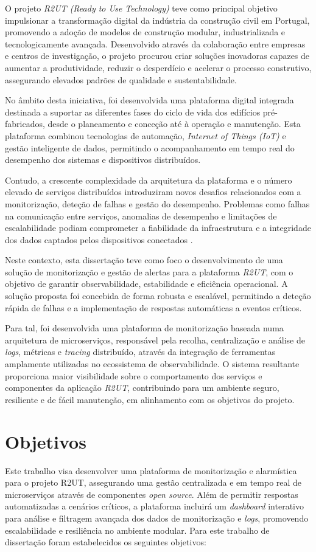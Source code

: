 O projeto \textit{R2UT (Ready to Use Technology)} teve como principal objetivo impulsionar a transformação digital da indústria da construção civil em Portugal, promovendo a adoção de modelos de construção modular, industrializada e tecnologicamente avançada. Desenvolvido através da colaboração entre empresas e centros de investigação, o projeto procurou criar soluções inovadoras capazes de aumentar a produtividade, reduzir o desperdício e acelerar o processo construtivo, assegurando elevados padrões de qualidade e sustentabilidade.

No âmbito desta iniciativa, foi desenvolvida uma plataforma digital integrada destinada a suportar as diferentes fases do ciclo de vida dos edifícios pré-fabricados, desde o planeamento e conceção até à operação e manutenção. Esta plataforma combinou tecnologias de automação, \textit{Internet of Things (IoT)} e gestão inteligente de dados, permitindo o acompanhamento em tempo real do desempenho dos sistemas e dispositivos distribuídos.

Contudo, a crescente complexidade da arquitetura da plataforma e o número elevado de serviços distribuídos introduziram novos desafios relacionados com a monitorização, deteção de falhas e gestão do desempenho. Problemas como falhas na comunicação entre serviços, anomalias de desempenho e limitações de escalabilidade podiam comprometer a fiabilidade da infraestrutura e a integridade dos dados captados pelos dispositivos conectados \cite{Barakat2017}.

Neste contexto, esta dissertação teve como foco o desenvolvimento de uma solução de monitorização e gestão de alertas para a plataforma \textit{R2UT}, com o objetivo de garantir observabilidade, estabilidade e eficiência operacional. A solução proposta foi concebida de forma robusta e escalável, permitindo a deteção rápida de falhas e a implementação de respostas automáticas a eventos críticos.

Para tal, foi desenvolvida uma plataforma de monitorização baseada numa arquitetura de microserviços, responsável pela recolha, centralização e análise de \textit{logs}, métricas e \textit{tracing} distribuído, através da integração de ferramentas amplamente utilizadas no ecossistema de observabilidade. O sistema resultante proporciona maior visibilidade sobre o comportamento dos serviços e componentes da aplicação \textit{R2UT}, contribuindo para um ambiente seguro, resiliente e de fácil manutenção, em alinhamento com os objetivos do projeto.

\section{Objetivos}
Este trabalho visa desenvolver uma plataforma de monitorização e alarmística para o projeto R2UT, assegurando uma gestão centralizada e em tempo real de microserviços através de componentes \textit{open source}. Além de permitir respostas automatizadas a cenários críticos, a plataforma incluirá um \textit{dashboard} interativo para análise e filtragem avançada dos dados de monitorização e \textit{logs}, promovendo escalabilidade e resiliência no ambiente modular.
Para este trabalho de dissertação foram estabelecidos os seguintes objetivos:

